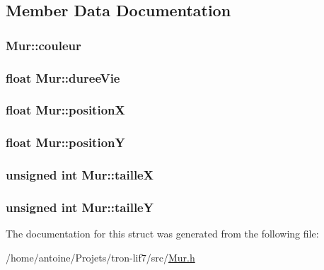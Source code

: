 \subsection{Member Data Documentation}
\hypertarget{structMur_adfb47de65971e21c8b3012cfcf7cab28}{
\subsubsection[{couleur}]{ Mur\-::couleur}}\label{structMur_adfb47de65971e21c8b3012cfcf7cab28}
\hypertarget{structMur_a7b0f44b48d4a8408e1adeb057ad201f8}{
\subsubsection[{duree\-Vie}]{\setlength{\rightskip}{0pt plus 5cm}float Mur\-::duree\-Vie}}\label{structMur_a7b0f44b48d4a8408e1adeb057ad201f8}
\hypertarget{structMur_affc832d25c091c05a2ab0340a38e8617}{
\subsubsection[{position\-X}]{\setlength{\rightskip}{0pt plus 5cm}float Mur\-::position\-X}}\label{structMur_affc832d25c091c05a2ab0340a38e8617}
\hypertarget{structMur_a5cb3e3d2e2f71120f6746772a44a0980}{
\subsubsection[{position\-Y}]{\setlength{\rightskip}{0pt plus 5cm}float Mur\-::position\-Y}}\label{structMur_a5cb3e3d2e2f71120f6746772a44a0980}
\hypertarget{structMur_a83d5a0639f49e58cfb805a91702d6701}{
\subsubsection[{taille\-X}]{\setlength{\rightskip}{0pt plus 5cm}unsigned int Mur\-::taille\-X}}\label{structMur_a83d5a0639f49e58cfb805a91702d6701}
\hypertarget{structMur_ad0c6b841ae4069d6b4e6559d7e88cf47}{
\subsubsection[{taille\-Y}]{\setlength{\rightskip}{0pt plus 5cm}unsigned int Mur\-::taille\-Y}}\label{structMur_ad0c6b841ae4069d6b4e6559d7e88cf47}


The documentation for this struct was generated from the following file\-:\begin{DoxyCompactItemize}
\item 
/home/antoine/\-Projets/tron-\/lif7/src/\hyperlink{Mur_8h}{Mur.\-h}\end{DoxyCompactItemize}
